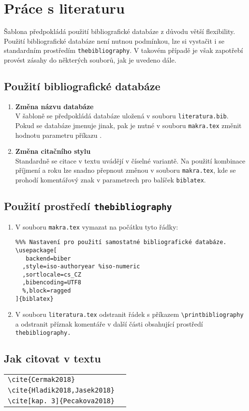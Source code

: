 
\chapter{Práce s literaturu}

Šablona předpokládá použití bibliografické databáze z důvodu větší flexibility. Použití bibliografické databáze není nutnou podmínkou, lze si vystačit i se standardním prostředím \texttt{thebibliography}. V takovém případě je však zapotřebí provést zásahy do některých souborů, jak je uvedeno dále.

\section{Použití bibliografické databáze}

\begin{enumerate}
\item\textbf{Změna názvu databáze}\\
V šabloně se předpokládá databáze uložená v souboru \texttt{literatura.bib}. Pokud se databáze jmenuje jinak, pak je nutné v souboru \texttt{makra.tex} změnit hodnotu parametru příkazu \verb''.
\item\textbf{Změna citačního stylu}\\
Standardně se citace v textu uvádějí v číselné variantě. Na použití kombinace příjmení a roku lze snadno přepnout změnou v souboru \texttt{makra.tex}, kde se prohodí komentářový znak v parametrech pro balíček \texttt{biblatex}.
\end{enumerate}


\section{Použití prostředí \texttt{thebibliography}}
\begin{enumerate}
\item V souboru \texttt{makra.tex} vymazat na počátku tyto řádky:
\begin{verbatim}
%%% Nastavení pro použití samostatné bibliografické databáze.
\usepackage[
   backend=biber
  ,style=iso-authoryear %iso-numeric
  ,sortlocale=cs_CZ
  ,bibencoding=UTF8
  %,block=ragged
]{biblatex}

\end{verbatim}
\item V souboru \texttt{literatura.tex} odstranit řádek s příkazem \verb'\printbibliography' a odstranit příznak komentáře v další části obsahující prostředí \texttt{thebibliography.}
\end{enumerate}


\section{Jak citovat v textu}
\begin{center}
\begin{tabular}{l@{~~$\longrightarrow$~~}l}
\verb|\cite{Cermak2018}|&\cite{Cermak2018}\\
\verb|\cite{Hladik2018,Jasek2018}|&\cite{Hladik2018,Jasek2018}\\
\verb|\cite[kap. 3]{Pecakova2018}|&\cite[kap. 3]{Pecakova2018}\\
\end{tabular}
\end{center}
